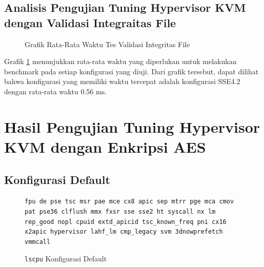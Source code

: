 \subsection{Analisis Pengujian Tuning Hypervisor KVM dengan Validasi Integraitas File}

\begin{figure}
    \centering
    \caption{Grafik Rata-Rata Waktu Tes Validasi Integritas File}
    \label{fig:file_integrity_test_graph}
\end{figure}

Grafik \ref{fig:file_integrity_test_graph} menunjukkan rata-rata waktu yang diperlukan untuk melakukan benchmark pada setiap konfigurasi yang diuji. Dari grafik tersebut, dapat dilihat bahwa konfigurasi yang memiliki waktu tercepat adalah konfigurasi SSE4.2 dengan rata-rata waktu 0.56 ms.

\section{Hasil Pengujian Tuning Hypervisor KVM dengan Enkripsi AES}

\subsection{Konfigurasi Default}
\begin{figure}
    \texttt{fpu de pse tsc msr pae mce cx8 apic sep mtrr pge mca cmov pat pse36 clflush mmx fxsr sse sse2 ht syscall nx lm rep\_good nopl cpuid extd\_apicid tsc\_known\_freq pni cx16 x2apic hypervisor lahf\_lm cmp\_legacy svm 3dnowprefetch vmmcall}
    \caption{\texttt{lscpu} Konfigurasi Default}
    \label{fig:lscpu_aes_test_default}
\end{figure}

